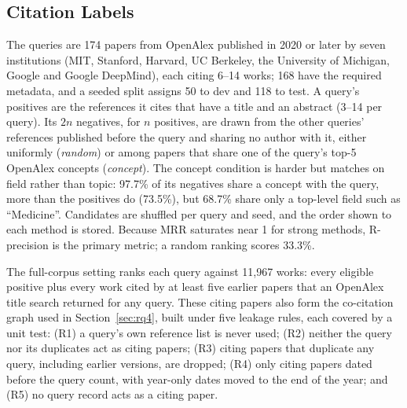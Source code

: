 \documentclass[sigconf,nonacm]{acmart}
\begin{document}
\subsection{Citation Labels}
\label{sec:citation-labels}
The queries are 174 papers from OpenAlex published in 2020 or later by seven institutions (MIT, Stanford, Harvard, UC Berkeley, the University of Michigan, Google and Google DeepMind), each citing 6--14 works; 168 have the required metadata, and a seeded split assigns 50 to dev and 118 to test.
A query's positives are the references it cites that have a title and an abstract (3--14 per query).
Its $2n$ negatives, for $n$ positives, are drawn from the other queries' references published before the query and sharing no author with it, either uniformly (\emph{random}) or among papers that share one of the query's top-5 OpenAlex concepts (\emph{concept}).
The concept condition is harder but matches on field rather than topic: 97.7\% of its negatives share a concept with the query, more than the positives do (73.5\%), but 68.7\% share only a top-level field such as ``Medicine''.
Candidates are shuffled per query and seed, and the order shown to each method is stored.
Because MRR saturates near 1 for strong methods, R-precision is the primary metric; a random ranking scores 33.3\%.

The full-corpus setting ranks each query against 11,967 works: every eligible positive plus every work cited by at least five earlier papers that an OpenAlex title search returned for any query.
These citing papers also form the co-citation graph used in Section~\ref{sec:rq4}, built under five leakage rules, each covered by a unit test: (R1) a query's own reference list is never used; (R2) neither the query nor its duplicates act as citing papers; (R3) citing papers that duplicate any query, including earlier versions, are dropped; (R4) only citing papers dated before the query count, with year-only dates moved to the end of the year; and (R5) no query record acts as a citing paper.
\end{document}
